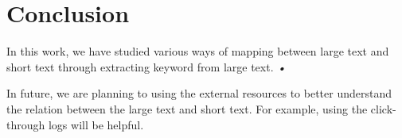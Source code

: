 \chapter{Conclusion}


In this work, we have studied various ways of mapping between large text and short text through extracting keyword from large text. \textit{•}

In future, we are planning to using the external resources to better understand the relation between the large text and short text. For example, using the click-through logs will be helpful.

